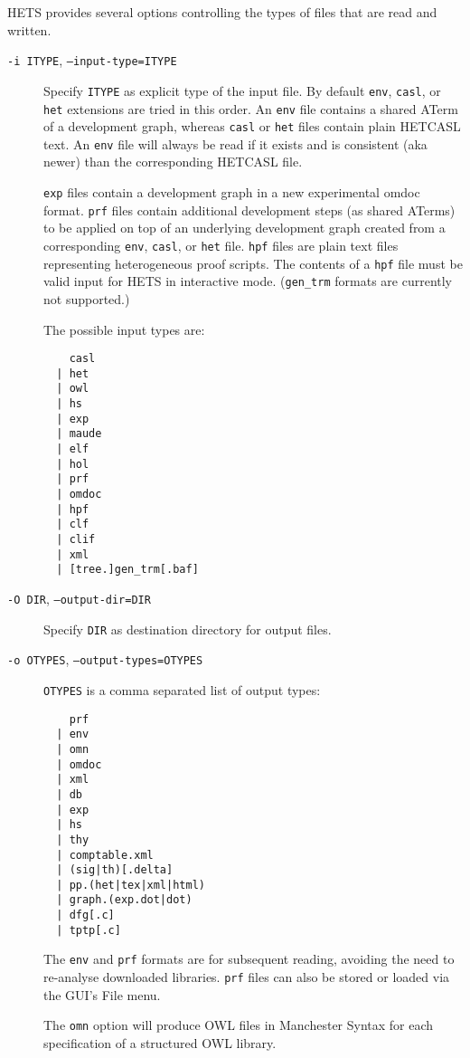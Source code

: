 \documentclass{article}
\newcommand{\normalTEXTSC}[2]{{#1\scriptsize#2}}
\newcommand     {\Hets}{\normalTEXTSC{H}{ETS}\xspace}
\newcommand{\HetCASL}{\normalTEXTSC{H}{ET}\normalTEXTSC{C}{ASL}\xspace}
\begin{document}
\Hets provides several options controlling the types of files
that are read and written.
\begin{description}
\item[\texttt{-i ITYPE}, \texttt{--input-type=ITYPE}] Specify \texttt{ITYPE}
  as explicit type of the input file.  By default \texttt{env}, \texttt{casl},
  or \texttt{het} extensions are tried in this order.  An \texttt{env} file
  contains a shared ATerm of a development graph, whereas \texttt{casl} or
  \texttt{het} files contain plain \HetCASL text. An \texttt{env} file will
  always be read if it exists and is consistent (aka newer) than the
  corresponding \HetCASL file.

  \texttt{exp} files contain a development graph in a new experimental omdoc
  format.  \texttt{prf} files contain additional development steps (as shared
  ATerms) to be applied on top of an underlying development graph created from
  a corresponding \texttt{env}, \texttt{casl}, or \texttt{het}
  file. \texttt{hpf} files are plain text files representing heterogeneous
  proof scripts. The contents of a \texttt{hpf} file must be valid input for
  \Hets in interactive mode.  (\texttt{gen\_trm} formats are currently not
  supported.)

The possible input types are:
\begin{verbatim}
    casl
  | het
  | owl
  | hs
  | exp
  | maude
  | elf
  | hol
  | prf
  | omdoc
  | hpf
  | clf
  | clif
  | xml
  | [tree.]gen_trm[.baf]
\end{verbatim}

\item[\texttt{-O DIR}, \texttt{--output-dir=DIR}]
Specify \texttt{DIR} as destination directory for output files.

\item[\texttt{-o OTYPES}, \texttt{--output-types=OTYPES}]
\texttt{OTYPES} is a comma separated list of output types:
\begin{verbatim}
    prf
  | env
  | omn
  | omdoc
  | xml
  | db
  | exp
  | hs
  | thy
  | comptable.xml
  | (sig|th)[.delta]
  | pp.(het|tex|xml|html)
  | graph.(exp.dot|dot)
  | dfg[.c]
  | tptp[.c]
\end{verbatim}
The \texttt{env} and \texttt{prf} formats are for subsequent reading,
avoiding the need to re-analyse downloaded libraries. \texttt{prf} files
can also be stored or loaded via the GUI's File menu.

The \texttt{omn} option \cite{books/sp/Kohlhase06} will produce OWL files in
Manchester Syntax for each specification of a structured OWL library.


\end{description}
\end{document}
